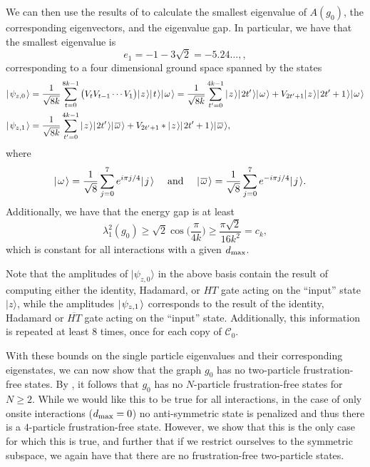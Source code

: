\documentclass[../thesis-main/thesis-main]{subfiles}
\begin{document}
We can then use the results of  to calculate the smallest eigenvalue of $A(g_0)$, the corresponding eigenvectors, and the eigenvalue gap.  In particular, we have that the smallest eigenvalue is 
\begin{equation}
  e_1 = -1 - 3 \sqrt{2} = -5.24\ldots, \label{eq:e_1},
\end{equation}
corresponding to a four dimensional ground space spanned by the states
\begin{align}
  |\mspace{2mu} \psi_{z,0} \mspace{2mu} \rangle &= \frac{1}{\sqrt{8k}}\sum_{t=0}^{8k-1} \big(V_t V_{t-1} \cdots V_1\big) |\mspace{2mu} z \mspace{2mu} \rangle |\mspace{2mu} t \mspace{2mu} \rangle |\mspace{2mu} \omega \mspace{2mu} \rangle= \frac{1}{\sqrt{8k}}\sum_{t'=0}^{4k-1} |\mspace{2mu} z \mspace{2mu} \rangle |\mspace{2mu} 2t' \mspace{2mu} \rangle|\mspace{2mu} \omega \mspace{2mu} \rangle + V_{2t' + 1} |\mspace{2mu} z \mspace{2mu} \rangle |\mspace{2mu} 2t'+1 \mspace{2mu} \rangle|\mspace{2mu} \omega \mspace{2mu} \rangle\label{eq:psi0m}\\
  |\mspace{2mu} \psi_{z,1} \mspace{2mu} \rangle &= \frac{1}{\sqrt{8k}} \sum_{t'=0}^{4k-1} |\mspace{2mu} z \mspace{2mu} \rangle|\mspace{2mu} 2t' \mspace{2mu} \rangle |\mspace{2mu} \overline{\omega} \mspace{2mu} \rangle + V_{2t'+1}* |\mspace{2mu} z \mspace{2mu} \rangle |\mspace{2mu} 2t'+1 \mspace{2mu} \rangle |\mspace{2mu} \overline{\omega} \mspace{2mu} \rangle\label{eq:psi1m},
\end{align}
where
\begin{align}
  |\mspace{2mu} \omega \mspace{2mu} \rangle &= \frac{1}{\sqrt{8}} \sum_{j=0}^{7} e^{i \pi j/4} |\mspace{2mu} j \mspace{2mu} \rangle &\text{ and } &&
  |\mspace{2mu} \overline{\omega} \mspace{2mu} \rangle &= \frac{1}{\sqrt{8}} \sum_{j=0}^7 e^{-i \pi j/4} |\mspace{2mu} j \mspace{2mu} \rangle.
\end{align}
Additionally, we have that the energy gap is at least 
\begin{equation}
  \lambda_1^2(g_0) \geq \sqrt{2} \cos\Big(\frac{\pi}{4k}\Big) \geq \frac{\pi\sqrt{2}}{16 k^2} = c_k,
\end{equation}
which is constant for all interactions with a given $d_{\text{max}}$.



Note that the amplitudes of $|\psi_{z,0}\rangle$ in the above basis contain the result of computing either the identity, Hadamard, or $HT$ gate acting on the ``input'' state $|z\rangle$, while the amplitudes $|\mspace{2mu} \psi_{z,1} \mspace{2mu} \rangle$ corresponds to the result of the identity, Hadamard or $\overline{HT}$ gate acting on the ``input'' state.  Additionally, this information is repeated at least $8$ times, once for each copy of $\mathcal{C}_0$.


With these bounds on the single particle eigenvalues and their corresponding eigenstates, we can now show that the graph $g_{0}$ has no two-particle frustration-free states. By , it follows that $g_0$ has no $N$-particle frustration-free states for $N\geq 2$.  While we would like this to be true for all interactions, in the case of only onsite interactions ($d_{\text{max}} =0$) no anti-symmetric state is penalized and thus there is a $4$-particle frustration-free state.  However, we show that this is the only case for which this is true, and further that if we restrict ourselves to the symmetric subspace, we again have that there are no frustration-free two-particle states.
\end{document}

